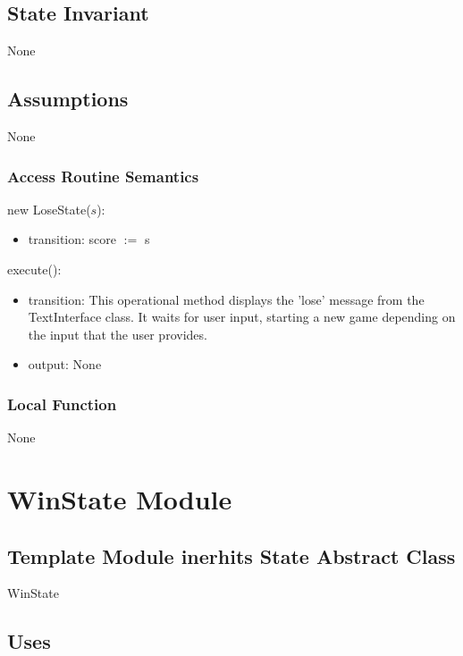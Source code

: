 \documentclass[12pt]{article}
\begin{document}
\subsection*{State Invariant}

None

\subsection*{Assumptions}

None

\subsubsection* {Access Routine Semantics}

\noindent new LoseState($s$):
\begin{itemize}
\item transition: score $:=$ s
\end{itemize}

\noindent execute():
\begin{itemize}
\item transition: This operational method displays the 'lose' message from the TextInterface class. It waits for user input, starting a new game depending on the input that the user provides.
\item output: None
\end{itemize}

\subsubsection* {Local Function}

None

\newpage

\section* {WinState Module}

\subsection* {Template Module inerhits State Abstract Class}

WinState

\subsection*{Uses}
\end{document}
